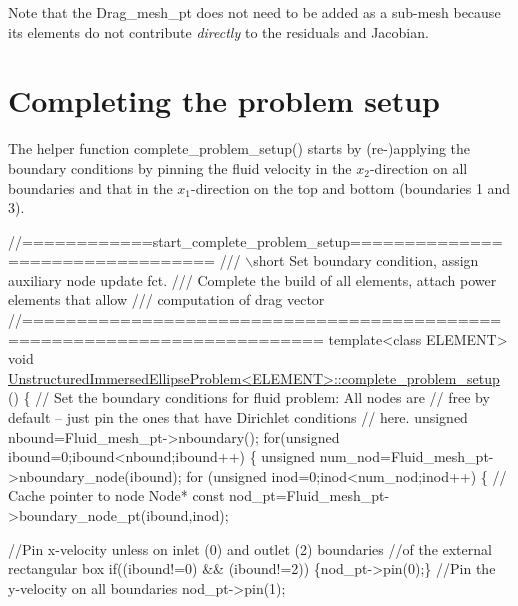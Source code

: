 Note that the {\ttfamily Drag\+\_\+mesh\+\_\+pt} does not need to be added as a sub-\/mesh because its elements do not contribute {\itshape  directly } to the residuals and Jacobian.



 

\hypertarget{index_complete}{}\section{Completing the problem setup}\label{index_complete}
The helper function {\ttfamily complete\+\_\+problem\+\_\+setup()} starts by (re-\/)applying the boundary conditions by pinning the fluid velocity in the $ x_{2}$-\/direction on all boundaries and that in the $ x_{1} $-\/direction on the top and bottom (boundaries 1 and 3).

 
\begin{DoxyCodeInclude}
\textcolor{comment}{//============start\_complete\_problem\_setup=================================}
\textcolor{comment}{/// \(\backslash\)short Set boundary condition, assign auxiliary node update fct.}
\textcolor{comment}{}\textcolor{comment}{/// Complete the build of all elements, attach power elements that allow}
\textcolor{comment}{}\textcolor{comment}{/// computation of drag vector}
\textcolor{comment}{}\textcolor{comment}{//=========================================================================}
\textcolor{keyword}{template}<\textcolor{keyword}{class} ELEMENT>
\textcolor{keywordtype}{void} \hyperlink{classUnstructuredImmersedEllipseProblem_a42b13e3306ff2a94053907644ba17c8d}{UnstructuredImmersedEllipseProblem<ELEMENT>::complete\_problem\_setup}
      ()
\{   
 \textcolor{comment}{// Set the boundary conditions for fluid problem: All nodes are}
 \textcolor{comment}{// free by default -- just pin the ones that have Dirichlet conditions}
 \textcolor{comment}{// here. }
 \textcolor{keywordtype}{unsigned} nbound=Fluid\_mesh\_pt->nboundary();
 \textcolor{keywordflow}{for}(\textcolor{keywordtype}{unsigned} ibound=0;ibound<nbound;ibound++)
  \{
   \textcolor{keywordtype}{unsigned} num\_nod=Fluid\_mesh\_pt->nboundary\_node(ibound);
   \textcolor{keywordflow}{for} (\textcolor{keywordtype}{unsigned} inod=0;inod<num\_nod;inod++)
    \{
     \textcolor{comment}{// Cache pointer to node}
     Node* \textcolor{keyword}{const} nod\_pt=Fluid\_mesh\_pt->boundary\_node\_pt(ibound,inod);
     
     \textcolor{comment}{//Pin x-velocity unless on inlet (0) and outlet (2) boundaries}
     \textcolor{comment}{//of the external rectangular box}
     \textcolor{keywordflow}{if}((ibound!=0) && (ibound!=2)) \{nod\_pt->pin(0);\}
     \textcolor{comment}{//Pin the y-velocity on all boundaries}
     nod\_pt->pin(1);

\end{DoxyCodeInclude}


